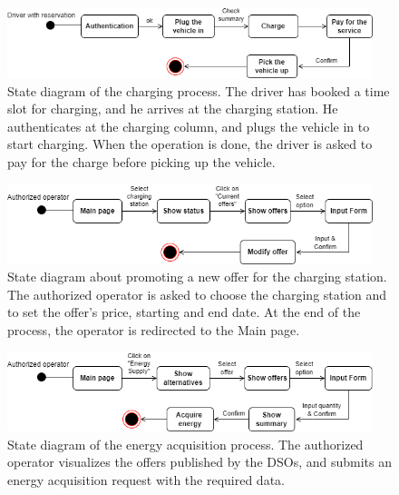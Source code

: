 \documentclass[../main.tex]{subfiles}
\begin{document}
\begin{figure}[H]
    \centering
    \includegraphics[width=0.95\textwidth]{statecharts/sc_charge.png}
    \caption{State diagram of the charging process. The driver has booked a time slot for charging, and he arrives at the charging station. He authenticates at the charging column, and plugs the vehicle in to start charging. When the operation is done, the driver is asked to pay for the charge before picking up the vehicle.}
    \label{fig:charge}
\end{figure}

\begin{figure}[H]
    \centering
    \includegraphics[width=0.95\textwidth]{statecharts/sc_modifyOffer.png}
    \caption{State diagram about promoting a new offer for the charging station. The authorized operator is asked to choose the charging station and to set the offer's price, starting and end date. At the end of the process, the operator is redirected to the Main page.}
    \label{fig:modifyOffer}
\end{figure}

\begin{figure}[H]
    \centering
    \includegraphics[width=0.95\textwidth]{statecharts/sc_acquireEnergy.png}
    \caption{State diagram of the energy acquisition process. The authorized operator visualizes the offers published by the DSOs, and submits an energy acquisition request with the required data.}
    \label{fig:acquireEnergy}
\end{figure}
\end{document}
